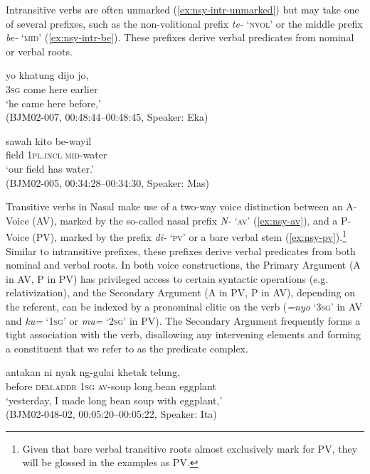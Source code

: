 \documentclass[output=paper,colorlinks,citecolor=brown
\ChapterDOI{10.5281/zenodo.15697585}
]{langscibook}
\begin{document}
Intransitive verbs are often unmarked (\ref{ex:nsy-intr-unmarked}) but may take one of several prefixes, such as the non-volitional prefix \textit{te-} `\textsc{nvol}' or the middle prefix \textit{be-} `\textsc{mid}' (\ref{ex:nsy-intr-be}). These prefixes derive verbal predicates from nominal or verbal roots.

\begin{exe}
    \ex\label{ex:nsy-intr-unmarked}
        \gll yo khatung dijo jo, \\
        3\textsc{sg} come here earlier \\
        \glt `he came here before,' \\
    \hfill (BJM02-007, 00:48:44–00:48:45, Speaker: Eka)
\end{exe}

\begin{exe}
    \ex\label{ex:nsy-intr-be} \gll
        sawah kito be-wayil \\
        field 1\textsc{pl.incl} \textsc{mid}-water \\
        \glt `our field has water.' \\
    \hfill (BJM02-005, 00:34:28–00:34:30, Speaker: Mas) 
\end{exe}

Transitive verbs in Nasal make use of a two-way voice distinction between an A-Voice (AV), marked by the so-called nasal prefix \textit{N-} `\textsc{av}' (\ref{ex:nsy-av}), and a P-Voice (PV), marked by the prefix \textit{di-} `\textsc{pv}' or a bare verbal stem (\ref{ex:nsy-pv}).\footnote{Given that bare verbal transitive roots almost exclusively mark for PV, they will be glossed in the examples as PV.} Similar to intransitive prefixes, these prefixes derive verbal predicates from both nominal and verbal roots. In both voice constructions, the Primary Argument (A in AV, P in PV) has privileged access to certain syntactic operations (e.g. relativization), and the Secondary Argument (A in PV, P in AV), depending on the referent, can be indexed by a pronominal clitic on the verb (\textit{=nyo} `3\textsc{sg}' in AV and \textit{ku=} `1\textsc{sg}' or \textit{mu=} `2\textsc{sg}' in PV). The Secondary Argument frequently forms a tight association with the verb, disallowing any intervening elements and forming a constituent that we refer to as the predicate complex.

\begin{exe}
    \ex\label{ex:nsy-av} \gll
        antakan ni nyak ng-gulai khetak telung, \\
        before \textsc{dem.addr} 1\textsc{sg} \textsc{av}-soup long.bean eggplant\\
        \glt `yesterday, I made long bean soup with eggplant,' \\
    \hfill (BJM02-048-02, 00:05:20–00:05:22, Speaker: Ita) 
\end{exe}
\end{document}
